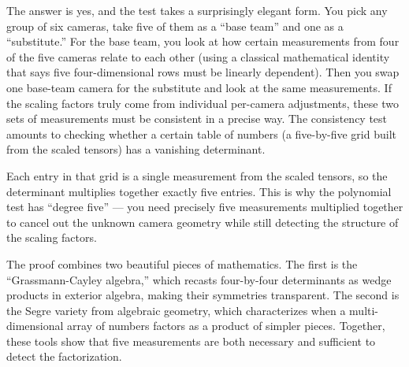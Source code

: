 The answer is yes, and the test takes a surprisingly elegant form. You pick
any group of six cameras, take five of them as a ``base team'' and one as a
``substitute.'' For the base team, you look at how certain measurements from
four of the five cameras relate to each other (using a classical mathematical
identity that says five four-dimensional rows must be linearly dependent).
Then you swap one base-team camera for the substitute and look at the same
measurements. If the scaling factors truly come from individual per-camera
adjustments, these two sets of measurements must be consistent in a precise
way. The consistency test amounts to checking whether a certain table of
numbers (a five-by-five grid built from the scaled tensors) has a vanishing
determinant.

Each entry in that grid is a single measurement from the scaled tensors, so
the determinant multiplies together exactly five entries. This is why the
polynomial test has ``degree five'' --- you need precisely five measurements
multiplied together to cancel out the unknown camera geometry while still
detecting the structure of the scaling factors.

The proof combines two beautiful pieces of mathematics. The first is the
``Grassmann-Cayley algebra,'' which recasts four-by-four determinants as
wedge products in exterior algebra, making their symmetries transparent. The
second is the Segre variety from algebraic geometry, which characterizes
when a multi-dimensional array of numbers factors as a product of simpler
pieces. Together, these tools show that five measurements are both necessary
and sufficient to detect the factorization.
